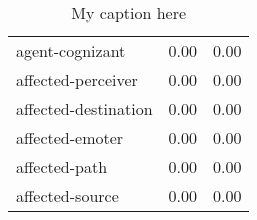 \begin{table}[!ht]
\begin{tabular}{lrr}
agent-cognizant      &       0.00 &                 0.00 \\
affected-perceiver   &       0.00 &                 0.00 \\
affected-destination &       0.00 &                 0.00 \\
affected-emoter      &       0.00 &                 0.00 \\
affected-path        &       0.00 &                 0.00 \\
affected-source      &       0.00 &                 0.00 \\
\bottomrule
\end{tabular}
\caption{My caption here}
\label{tab:PARTICIPANT_ROLE-oe-combined-errors}
\end{table}
